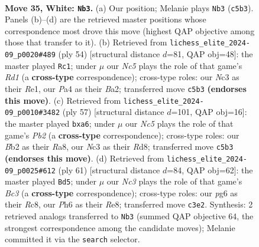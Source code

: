 \documentclass[11pt]{article}
\begin{document}
\clearpage

\begin{figure}[p]\centering
\begin{subfigure}{0.46\textwidth}\centering
\resizebox{\linewidth}{!}{%
\newchessgame
\chessboard[
  setfen={rn1b2r1/1p3b1p/2k3pP/p1NpPp2/P7/2N3P1/1B4K1/R4R2 w - - 13 35},
  showmover=false,
  pgfstyle=straightmove, color=movearrow, markmove={c5-b3}
]}
\caption{}
\end{subfigure}\hfill
\begin{subfigure}{0.46\textwidth}\centering
\resizebox{\linewidth}{!}{%
\newchessgame
\chessboard[
  setfen={1nr1r1k1/2p1pp2/p4bp1/1p1P2N1/1P3B2/P6P/B1b2P2/3RR1K1 w - - 0 28},
  showmover=false,
  pgfstyle=straightmove, color=movearrow, markmove={d1-c1}
]}
\caption{}
\end{subfigure}
\\[4pt]
\begin{subfigure}{0.46\textwidth}\centering
\resizebox{\linewidth}{!}{%
\newchessgame
\chessboard[
  setfen={r2r4/pp3kp1/P2Pnb2/2P1p3/4N3/3PB2P/1P6/R4RK1 b - - 0 29},
  showmover=false,
  pgfstyle=straightmove, color=movearrow, markmove={b7-a6}
]}
\caption{}
\end{subfigure}\hfill
\begin{subfigure}{0.46\textwidth}\centering
\resizebox{\linewidth}{!}{%
\newchessgame
\chessboard[
  setfen={2r1rbk1/R1P2p1p/2b3p1/8/2p1nB2/5BP1/P3PP1P/2R3K1 b - - 0 31},
  showmover=false,
  pgfstyle=straightmove, color=movearrow, markmove={c6-d5}
]}
\caption{}
\end{subfigure}
\caption{\textbf{Move 35, White: \texttt{Nb3}.} (a) Our position; Melanie plays \texttt{Nb3} (\texttt{c5b3}). Panels (b)--(d) are the retrieved master positions whose correspondence most drove this move (highest QAP objective among those that transfer to it). (b) Retrieved from \texttt{lichess\_elite\_2024-09\_p0020\#489} (ply 54) [structural distance $d$=81, QAP obj=48]: the master played \texttt{Rc1}; under $\mu$ our \emph{Nc5} plays the role of that game's \emph{Rd1} (a \textbf{cross-type} correspondence); cross-type roles: our \emph{N}c3 as their \emph{R}e1, our \emph{P}a4 as their \emph{B}a2; transferred move \texttt{c5b3} \textbf{(endorses this move)}. (c) Retrieved from \texttt{lichess\_elite\_2024-09\_p0010\#3482} (ply 57) [structural distance $d$=101, QAP obj=16]: the master played \texttt{bxa6}; under $\mu$ our \emph{Nc5} plays the role of that game's \emph{Pb2} (a \textbf{cross-type} correspondence); cross-type roles: our \emph{B}b2 as their \emph{R}a8, our \emph{N}c3 as their \emph{R}d8; transferred move \texttt{c5b3} \textbf{(endorses this move)}. (d) Retrieved from \texttt{lichess\_elite\_2024-09\_p0025\#612} (ply 61) [structural distance $d$=84, QAP obj=62]: the master played \texttt{Bd5}; under $\mu$ our \emph{Nc3} plays the role of that game's \emph{Bc3} (a \textbf{cross-type} correspondence); cross-type roles: our \emph{p}g6 as their \emph{R}c8, our \emph{P}h6 as their \emph{R}e8; transferred move \texttt{c3e2}. Synthesis: 2 retrieved analogs transferred to \texttt{Nb3} (summed QAP objective 64, the strongest correspondence among the candidate moves); Melanie committed it via the \texttt{search} selector.}
\label{fig:thought-m68}
\end{figure}
\end{document}
